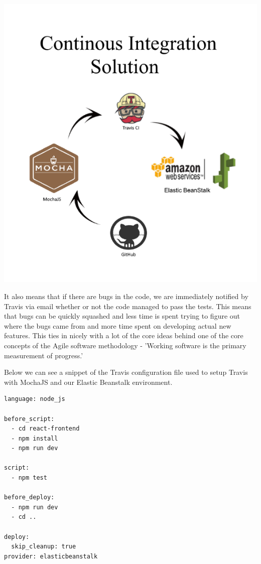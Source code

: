 \begin{center}    
	\includegraphics{img/SDLC.png}
\end{center}


It also means that if there are bugs in the code, we are immediately notified by Travis via email whether or not the code managed to pass the tests. This means that bugs can be quickly squashed and less time is spent trying to figure out where the bugs came from and more time spent on developing actual new features. This ties in nicely with a lot of the core ideas behind one of the core concepts of the Agile software methodology - 'Working software is the primary measurement of progress.'

Below we can see a snippet of the Travis configuration file used to setup Travis with MochaJS and our Elastic Beanstalk environment.
\begin{verbatim}
language: node_js

before_script: 
  - cd react-frontend 
  - npm install
  - npm run dev
  
script:
  - npm test

before_deploy:
  - npm run dev
  - cd ..

deploy:
  skip_cleanup: true
provider: elasticbeanstalk
  \end{verbatim}

